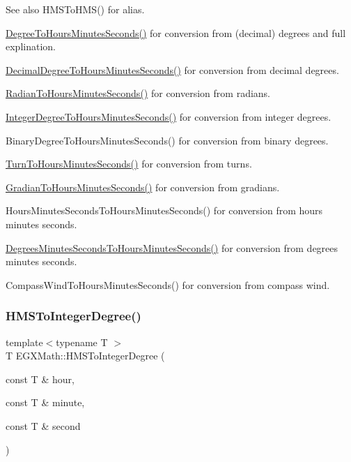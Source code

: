 \begin{DoxySeeAlso}{See also}
H\+M\+S\+To\+H\+M\+S() for alias. 

\mbox{\hyperlink{group___e_g_x_math-_angle_conversions-_degree_ga770b13da33b6f6c7bfa398cca7f24dbe}{Degree\+To\+Hours\+Minutes\+Seconds()}} for conversion from (decimal) degrees and full explination. 

\mbox{\hyperlink{group___e_g_x_math-_angle_conversions-_decimal_degree_gaa3f0b6c7c497882935487ad2d55a0f5a}{Decimal\+Degree\+To\+Hours\+Minutes\+Seconds()}} for conversion from decimal degrees. 

\mbox{\hyperlink{group___e_g_x_math-_angle_conversions-_radian_ga3467598d89af2b8ff68af50b39bb19e2}{Radian\+To\+Hours\+Minutes\+Seconds()}} for conversion from radians. 

\mbox{\hyperlink{group___e_g_x_math-_angle_conversions-_integer_degree_gaaac96728b305fd8ed024843f4e92fd08}{Integer\+Degree\+To\+Hours\+Minutes\+Seconds()}} for conversion from integer degrees. 

Binary\+Degree\+To\+Hours\+Minutes\+Seconds() for conversion from binary degrees. 

\mbox{\hyperlink{group___e_g_x_math-_angle_conversions-_turn_ga0bc017b3314253352ddec728d3f6b76a}{Turn\+To\+Hours\+Minutes\+Seconds()}} for conversion from turns. 

\mbox{\hyperlink{group___e_g_x_math-_angle_conversions-_gradian_gaf174cf5b716d5a490b3744ffe9ff3b97}{Gradian\+To\+Hours\+Minutes\+Seconds()}} for conversion from gradians. 

Hours\+Minutes\+Seconds\+To\+Hours\+Minutes\+Seconds() for conversion from hours minutes seconds. 

\mbox{\hyperlink{group___e_g_x_math-_angle_conversions-_degrees_minutes_seconds_ga7fc14ecc37f95ec9228821c3a087e83b}{Degrees\+Minutes\+Seconds\+To\+Hours\+Minutes\+Seconds()}} for conversion from degrees minutes seconds. 

Compass\+Wind\+To\+Hours\+Minutes\+Seconds() for conversion from compass wind. 
\end{DoxySeeAlso}
\mbox{\label{group___e_g_x_math-_angle_conversions-_h_m_s_ga5091437050cc32e29f722a3c50650405}} 
\subsubsection{\texorpdfstring{H\+M\+S\+To\+Integer\+Degree()}{HMSToIntegerDegree()}}
{\footnotesize\ttfamily template$<$typename T $>$ \\
T E\+G\+X\+Math\+::\+H\+M\+S\+To\+Integer\+Degree (\begin{DoxyParamCaption}\item[{const T \&}]{hour,  }\item[{const T \&}]{minute,  }\item[{const T \&}]{second }\end{DoxyParamCaption})}



